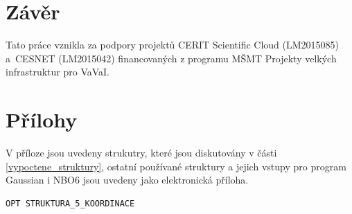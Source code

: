 \documentclass[
digital, %
table,   %
lof,     %
lot,     %
oneside,
]{fithesis3}
\begin{document}
\chapter{Závěr}
Tato práce vznikla za podpory projektů CERIT Scientific Cloud (LM2015085) a~CESNET (LM2015042) financovaných z programu MŠMT Projekty velkých infrastruktur pro VaVaI.
\newpage
\chapter{Přílohy}
V příloze jsou uvedeny strukutry, které jsou diskutovány v části \ref{vypoctene_struktury}, ostatní používané struktury a jejich vstupy pro program Gaussian i NBO6 jsou uvedeny jako elektronická příloha.
\begin{lstlisting}[frame=single, caption={struktura koordinace 5},label=DescriptiveLabel]
OPT STRUKTURA_5_KOORDINACE


\end{lstlisting}
\end{document}
